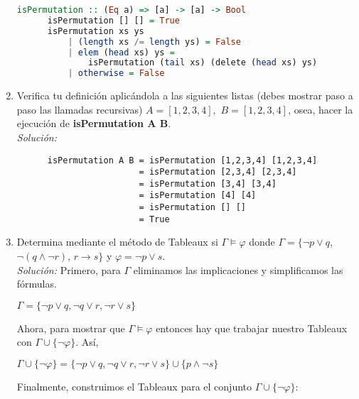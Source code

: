 \documentclass[letterpaper,11pt]{article}
\begin{document}
\begin{enumerate}
\begin{lstlisting}[language=Haskell]
      isPermutation :: (Eq a) => [a] -> [a] -> Bool
      isPermutation [] [] = True
      isPermutation xs ys 
          | (length xs /= length ys) = False
          | elem (head xs) ys = 
              isPermutation (tail xs) (delete (head xs) ys)
          | otherwise = False
   \end{lstlisting}

   \newpage
   \item Verifica tu definición aplicándola a las siguientes listas (debes
   mostrar paso a paso las llamadas recursivas) $A = [1,2,3,4],$ 
   $B = [1,2,3,4]$, osea, hacer la ejecución de \textbf{isPermutation A B}.\\
   \textit{Solución:}
   
   \begin{lstlisting}
      isPermutation A B = isPermutation [1,2,3,4] [1,2,3,4]
                        = isPermutation [2,3,4] [2,3,4]
                        = isPermutation [3,4] [3,4]
                        = isPermutation [4] [4]
                        = isPermutation [] []
                        = True
   \end{lstlisting}
    
   \item Determina mediante el método de Tableaux si $\Gamma \models \varphi$
   donde $\Gamma = \{ \neg p \lor q$, $\neg (q \land \neg r)$, 
   $r \rightarrow s \}$ y $\varphi = \neg p \lor s$.\\
   \textit{Solución:} Primero, para $\Gamma$ eliminamos las implicaciones y
   simplificamos las fórmulas. 

   \begin{center}
      $\Gamma = \{ \neg p \lor q, \neg q \lor r, \neg r \lor s \}$
   \end{center}
   
   Ahora, para mostrar que $\Gamma \models \varphi$ entonces hay que trabajar
   nuestro Tableaux con $\Gamma \cup \{\neg \varphi \}$. Así,

   \begin{center}
      $\Gamma \cup \{\neg \varphi \} = 
      \{ \neg p \lor q, \neg q \lor r, \neg r \lor s \} 
      \cup \{p \land \neg s \}$
   \end{center}

   Finalmente, construimos el Tableaux para el conjunto
   $\Gamma \cup \{ \neg \varphi \}$: \\ 


\end{enumerate}
\end{document}
